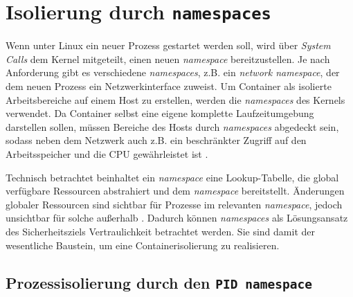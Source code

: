 \documentclass[../main.tex]{subfiles}
\begin{document}

	\section{Isolierung durch \texttt{namespaces}}
  \label{secIsolierung}
		Wenn unter Linux ein neuer Prozess gestartet werden soll, wird über \emph{System Calls} dem Kernel mitgeteilt, einen neuen \emph{namespace} bereitzustellen. Je nach Anforderung gibt es verschiedene \emph{namespaces}, z.B. ein \emph{network namespace}, der dem neuen Prozess ein Netzwerkinterface zuweist. Um Container als isolierte Arbeitsbereiche auf einem Host zu erstellen, werden die \emph{namespaces} des Kernels verwendet. Da Container selbst eine eigene komplette Laufzeitumgebung darstellen sollen, müssen Bereiche des Hosts durch \emph{namespaces} abgedeckt sein, sodass neben dem Netzwerk auch z.B. ein beschränkter Zugriff auf den Arbeitsspeicher und die \acrshort{CPU} gewährleistet ist \cite[S.3]{dockerIntroIEEE}.

		Technisch betrachtet beinhaltet ein \emph{namespace} eine Lookup-Tabelle, die global verfügbare Ressourcen abstrahiert und dem \emph{namespace} bereitstellt. Änderungen globaler Ressourcen sind sichtbar für Prozesse im relevanten \emph{namespace}, jedoch unsichtbar für solche außerhalb \cite[S.1+2]{IBMcheckpointRestart}\cite{namespaces}. Dadurch können \emph{namespaces} als Lösungsansatz des Sicherheitsziels Vertraulichkeit betrachtet werden. Sie sind damit der wesentliche Baustein, um eine Containerisolierung zu realisieren.



		\subsection{Prozessisolierung durch den \texttt{\acrshort{PID} namespace}}
		\label{secIsoProcesses}
\end{document}
